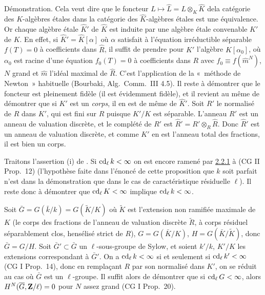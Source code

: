 \documentclass[10pt]{../fichiers-configuration-latex/smfart}
\begin{document}
Démonstration. Cela veut dire que le foncteur $L\mapsto
\widehat{L}=L\otimes_K \widehat{K}$ de\pageoriginale la catégorie des
$K$-algèbres étales dans la catégorie des $\widehat{K}$-algèbres
étales est une équivalence. Or chaque algèbre étale $\widehat{K}'$ de
$\widehat{K}$ est induite par une algèbre étale convenable $K'$ de
$K$. En effet, si $\widehat{K}'=\widehat{K}[\alpha]$ où $\alpha$
satisfait à l'équation irréductible séparable $f(T)=0$ à coefficients
dans $\widehat{R}$, il suffit de prendre pour $K'$ l'algèbre 
$K[\alpha_0]$, où $\alpha_0$ est racine d'une équation $f_0(T)=0$ à
coefficients dans $R$ avec $f_0\equiv f(\widehat{m}^N)$, $N$ grand et
$\widehat{m}$ l'idéal maximal de $\widehat{R}$. C'est l'application de
la « méthode de Newton » habituelle (Bourbaki, Alg.~Comm.~III
4.5). Il reste à démontrer que le foncteur est pleinement fidèle (il
est évidemment fidèle), et il revient au même de démontrer que si $K'$
est un \emph{corps}, il en est de même de $\widehat{K}'$. Soit $R'$ le
normalisé de $R$ dans $K'$, qui est fini sur $R$ puisque $K'/K$ est
séparable. L'anneau $R'$ est un anneau de valuation discrète, et le
complété de $R'$ est $\widehat{R}'=R'\otimes_R \widehat{R}$. Donc
$\widehat{R}'$ est un anneau de valuation discrète, et comme $K'$ en
est l'anneau total des fractions, il est bien un corps.

Traitons l'assertion (i) de .
Si $\operatorname{cd}_{\ell}k<\infty$ on est encore ramené par \hyperref[X.lem2.2.1]{2.2.1}
à (CG II Prop.~12) (l'hypothèse faite dans l'énoncé
de cette proposition que $k$ soit parfait n'est  dans la
démonstration que dans le cas de caractéristique résiduelle
$\ell$). Il reste donc à démontrer que $\operatorname{cd}_{\ell}K<\infty$ implique
$\operatorname{cd}_{\ell}k<\infty$.

Soit $\bar{G}=G(\bar{k}/k)=G(\widetilde{K}/K)$ où $\widetilde{K}$ est
l'extension non ramifiée maximale de $K$ (\ie le corps des fractions
de l'anneau de valuation discrète $\widetilde{R}$, à corps résiduel
séparablement clos, hensélisé strict de $R$), $G=G(\bar{K}/K)$,
$H=G(\bar{K}/\widetilde{K})$, donc $\bar{G}=G/H$. Soit
$\bar{G}'\subset \bar{G}$ un $\ell$-sous-groupe de Sylow, et soient
$k'/k$, $K'/K$ les extensions correspondant à $\bar{G}'$. On a
$\operatorname{cd}_{\ell}k<\infty$ si et seulement si $\operatorname{cd}_{\ell}k'<\infty$ (CG I
Prop.~14), donc en remplaçant $R$ par son normalisé dans $K'$, on
se réduit au cas où $\bar{G}$ est un $\ell$-groupe. Il suffit alors de
démontrer que si $\operatorname{cd}_{\ell}G<\infty$, alors
$H^N(\overline{G},\mathbf{Z}/\ell)=0$ pour $N$ assez grand (CG
I Prop.~20).
\end{document}
